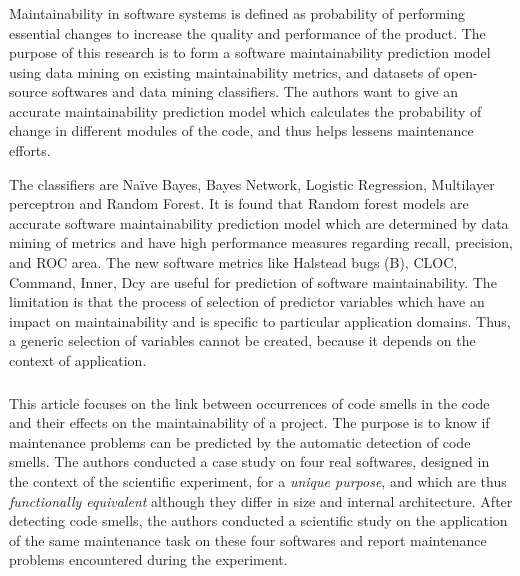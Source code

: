     \subsubsection{ \cite{s116_maintainability}}
    
        Maintainability in software systems is defined as probability of performing essential changes to increase the quality and performance of the product. The purpose of this research is to form a software maintainability prediction model using data mining on existing maintainability metrics, and datasets of open-source softwares and data mining classifiers. The authors want to give an accurate maintainability prediction model which calculates the probability of change in different modules of the code, and thus helps lessens maintenance efforts.
        
        The classifiers are Naïve Bayes, Bayes Network, Logistic Regression, Multilayer perceptron and Random Forest. It is found that Random forest models are accurate software maintainability prediction model which are determined by data mining of metrics and have high performance measures regarding recall, precision, and ROC area. The new software metrics like Halstead bugs (B), CLOC, Command, Inner, Dcy are useful for prediction of software maintainability. The limitation is that the process of selection of predictor variables which have an impact on maintainability and is specific to particular application domains. Thus, a generic selection of variables cannot be created, because it depends on the context of application.
    
    \subsubsection{ \cite{s219_maintainability}}
    \label{article_summary_s219}
    
        This article focuses on the link between occurrences of code smells in the code and their effects on the maintainability of a project. The purpose is to know if maintenance problems can be predicted by the automatic detection of code smells. The authors conducted a case study on four real softwares, designed in the context of the scientific experiment, for a \textit{unique purpose}, and which are thus \textit{functionally equivalent} although they differ in size and internal architecture. After detecting code smells, the authors conducted a scientific study on the application of the same maintenance task on these four softwares and report maintenance problems encountered during the experiment.    
        
